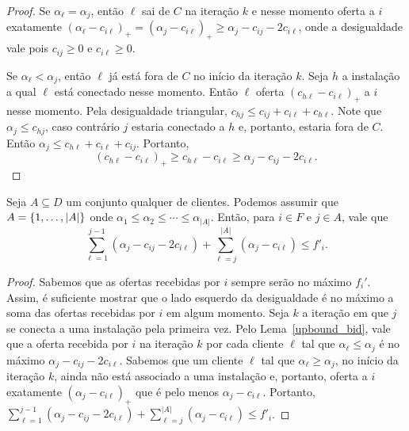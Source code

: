 \begin{proof}
Se $\alpha_\ell = \alpha_j$, então $\ell$ sai de $C$ na iteração $k$ e nesse momento oferta a $i$ exatamente $(\alpha_\ell - c_{i\ell})_+ = (\alpha_j - c_{i\ell})_+ \geq \alpha_j - c_{ij} - 2c_{i\ell}$, onde a desigualdade vale pois $c_{ij}\geq 0$ e $c_{i\ell} \geq 0$.

Se $\alpha_\ell < \alpha_j $, então $\ell$ já está fora de $C$ no início da iteração $k$. 
Seja $h$ a instalação a qual $\ell$ está conectado nesse momento. 
Então $\ell$ oferta $(c_{h\ell} - c_{i\ell})_+$ a $i$ nesse momento. 
Pela desigualdade triangular, $c_{hj} \leq c_{ij} + c_{i\ell} + c_{h\ell}$. 
Note que $\alpha_j \leq c_{hj}$, caso contrário $j$ estaria conectado a $h$ e, portanto, estaria fora de $C$. Então $\alpha_j \leq c_{h\ell} + c_{i\ell } + c_{ij} $. 
Portanto,
\[ (c_{h\ell} - c_{i\ell})_+ \geq c_{h\ell} - c_{i\ell} \geq \alpha_j - c_{ij} - 2c_{i\ell}.\]
\end{proof}
\begin{lemma}
\label{lowerbound_fcost}
Seja $A \subseteq D$ um conjunto qualquer de clientes. Podemos assumir que $A = \{1,\ldots,|A|\}$ onde $\alpha_1 \leq \alpha_2 \leq \cdots \leq \alpha_{|A|}$. Então, para $i \in F$ e $j \in A$, vale que
\[ \sum_{\ell=1}^{j-1}(\alpha_j - c_{ij} - 2c_{i\ell}) + \sum_{\ell= j}^{|A|}(\alpha_j - c_{i\ell}) \leq f'_i.
\]
\end{lemma}
\begin{proof}
Sabemos que as ofertas recebidas por $i$ sempre serão no máximo $f_i'$. Assim, é suficiente mostrar que o lado esquerdo da desigualdade é no máximo a soma das ofertas recebidas por $i$ em algum momento. Seja $k$ a iteração em que $j$ se conecta a uma instalação pela primeira vez. Pelo Lema~\ref{upbound_bid}, vale que a oferta recebida por $i$ na iteração $k$ por cada cliente $\ell$ tal que $\alpha_\ell \leq \alpha_j$ é no máximo $\alpha_j - c_{ij} - 2c_{i\ell}$. Sabemos que um cliente $\ell$ tal que $\alpha_\ell \geq \alpha_j$, no início da iteração $k$, ainda não está associado a uma instalação e, 
portanto, oferta a $i$ exatamente $(\alpha_j - c_{i\ell})_+$  que é pelo menos $\alpha_j - c_{i\ell}$. Portanto, $\sum_{\ell=1}^{j-1}(\alpha_j - c_{ij} - 2c_{i\ell}) + \sum_{\ell= j}^{|A|}(\alpha_j - c_{i\ell}) \leq f'_i$.
\end{proof}


